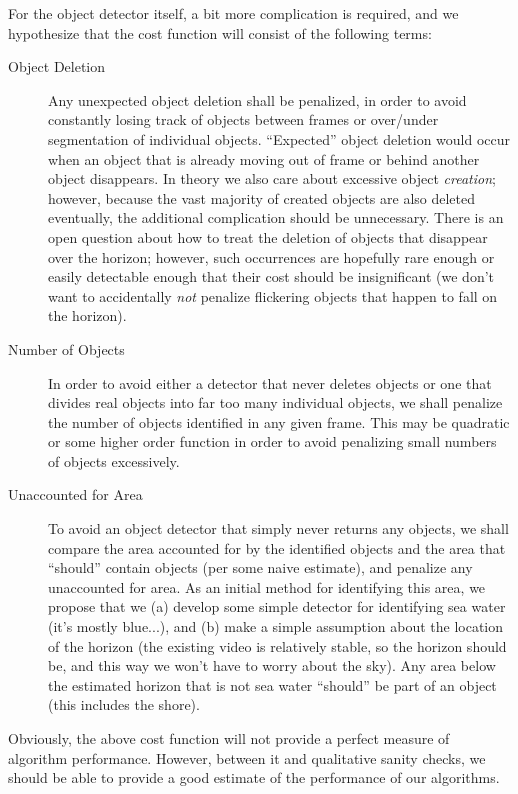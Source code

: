 \documentclass{article}
\begin{document}
For the object detector itself, a bit more complication is
required, and we hypothesize that the cost function will
consist of the following terms:

\begin{description}
\item[Object Deletion] Any unexpected object deletion shall
   be penalized, in order to avoid constantly losing track
   of objects between frames or over/under segmentation of
   individual objects. ``Expected'' object deletion would
   occur when an object that is already moving out of frame
   or behind another object disappears. In theory we also
   care about excessive object \emph{creation}; however,
   because the vast majority of created objects are also
   deleted eventually, the additional complication should
   be unnecessary. There is an open question about how
   to treat the deletion of objects that disappear over
   the horizon; however, such occurrences are hopefully
   rare enough or easily detectable enough that their
   cost should be insignificant (we don't want to
   accidentally \emph{not} penalize flickering objects
   that happen to fall on the horizon).
\item[Number of Objects] In order to avoid either a
   detector that never deletes objects or one that
   divides real objects into far too many individual
   objects, we shall penalize the number of objects
   identified in any given frame. This may be quadratic
   or some higher order function in order to avoid
   penalizing small numbers of objects excessively.
\item[Unaccounted for Area] To avoid an object
   detector that simply never returns any objects,
   we shall compare the area accounted for by the
   identified objects and the area that ``should''
   contain objects (per some naive estimate), and
   penalize any unaccounted for area.
   As an initial method for identifying this area,
   we propose that we (a) develop some simple detector
   for identifying sea water (it's mostly blue...),
   and (b) make a simple assumption about the location
   of the horizon (the existing video is relatively stable,
   so the horizon should be, and this way we won't have
   to worry about the sky). Any area below the estimated
   horizon that is not sea water ``should'' be part of
   an object (this includes the shore).
\end{description}

Obviously, the above cost function will not provide a perfect
measure of algorithm performance. However, between it and
qualitative sanity checks, we should be able to provide
a good estimate of the performance of our algorithms.
\end{document}
